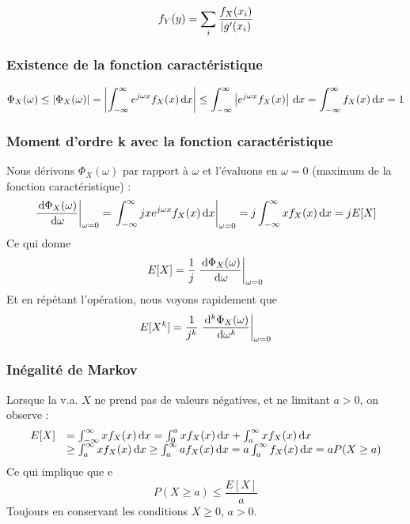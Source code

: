 \documentclass[11pt,a4paper]{article}
\numberwithin{equation}{section}
\begin{document}
\begin{equation}
    f_Y(y) = \sum\limits_{i}^{}\frac{f_X(x_i)}{|g'(x_i)}
\end{equation}
\subsubsection{Existence de la fonction caractéristique}
\label{preuve_existence_fonc_carac}
\[\Phi_X(\omega) \leq |\Phi_X(\omega)| = \left|\int_{-\infty}^{\infty} e^{j\omega x} f_X(x)\, \mathrm d x\right| \leq \int_{-\infty}^{\infty} \left|e^{j\omega x}f_X(x)\right|\, \mathrm d x = \int_{-\infty}^{\infty} f_X(x)\, \mathrm d x = 1\]

\subsubsection{Moment d'ordre k avec la fonction caractéristique}
\label{preuve_momentK_foncCarac}
Nous dérivons $\Phi_X(\omega)$ par rapport à $\omega$ et l'évaluons en $\omega = 0$ (maximum de la fonction caractéristique) :
\begin{equation}
    \left.\frac{\, \mathrm d \Phi_X(\omega)}{\, \mathrm d \omega}\right|_{\omega = 0} = \left.\int_{-\infty}^{\infty} jxe^{j\omega x}f_X(x)\, \mathrm d x\right|_{\omega = 0} = j\int_{-\infty}^{\infty} xf_X(x) \, \mathrm d x = jE[X]
\end{equation}
Ce qui donne 
\begin{equation}
    E[X] = \frac{1}{j} \left.\frac{\, \mathrm d \Phi_X(\omega)}{\, \mathrm d \omega}\right|_{\omega = 0}
\end{equation}
Et en répétant l'opération, nous voyons rapidement que 
\begin{equation}
    E[X^k] = \frac{1}{j^k} \left.\frac{\, \mathrm d ^k\Phi_X(\omega)}{\, \mathrm d \omega^k}\right|_{\omega = 0}
\end{equation}
\subsubsection{Inégalité de Markov}
\label{preuve_inegalite_markov}
Lorsque la v.a. $X$ ne prend pas de valeurs négatives, et ne limitant $a > 0$, on observe :
\begin{equation}
    \begin{array}{ll}
        E[X]     &= \int_{-\infty}^{\infty} xf_X(x) \, \mathrm d x = \int_0^a xf_X(x) \, \mathrm d x + \int_a^\infty xf_X(x) \, \mathrm d x\\
                 &\geq \int_a^\infty xf_X(x) \, \mathrm d x \geq  \int_a^\infty af_X(x) \, \mathrm d x = a\int_a^\infty f_X(x) \, \mathrm d x = aP(X \geq a)
    \end{array}
\end{equation}
Ce qui implique que e
\begin{equation}
    P(X \geq a) \leq \frac{E[X]}{a}
\end{equation}
Toujours en conservant les conditions $X \geq 0$, $a > 0$.
\end{document}
